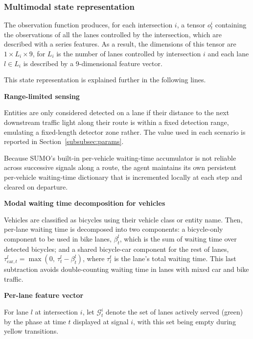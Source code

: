 \subsubsection{Multimodal state representation} \label{subsubsec:idqnmm_state}
 
The observation function produces, for each intersection $i$, a tensor $o_t^i$ containing the observations of all the lanes controlled by the intersection, which are described with a series features. As a result, the dimensions of this tensor are $1 \times L_i \times 9$, for $L_i$ is the number of lanes controlled by intersection $i$ and each lane $l \in L_i$ is described by a 9-dimensional feature vector.

This state representation is explained further in the following lines.

\medskip

\noindent \textbf{Range-limited sensing}
 
\noindent Entities are only considered detected on a lane if their distance to the next downstream traffic light along their route is within a fixed detection range, emulating a fixed-length detector zone rather. The value used in each scenario is reported in Section~\ref{subsubsec:params}.

Because SUMO's built-in per-vehicle waiting-time accumulator is not reliable across successive signals along a route, the agent maintains its own persistent per-vehicle waiting-time dictionary that is incremented locally at each step and cleared on departure.

\medskip

\noindent \textbf{Modal waiting time decomposition for vehicles}
 
\noindent Vehicles are classified as bicycles using their vehicle class or entity name. Then, per-lane waiting time is decomposed into two components: a bicycle-only component to be used in bike lanes, $\beta_t^l$, which is the sum of waiting time over detected bicycles; and a shared bicycle-car component for the rest of lanes, 
$\tau_{\text{car},t}^l = \max(0,\ \tau_t^l - \beta_t^l)$, where $\tau_l^t$ is the lane's total waiting time. This last subtraction  avoids double-counting waiting time in lanes with mixed car and bike traffic.
\medskip

\noindent \textbf{Per-lane feature vector}
 
\noindent For lane $l$ at intersection $i$, let $\mathcal{G}_t^i$ denote the set of lanes actively served (green) by the phase at time $t$ displayed at signal $i$, with this set being empty during yellow transitions.

